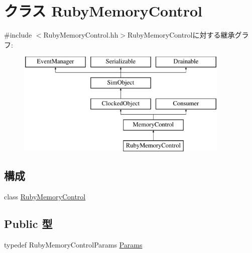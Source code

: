 \hypertarget{classRubyMemoryControl}{
\section{クラス RubyMemoryControl}
\label{classRubyMemoryControl}
}


{\ttfamily \#include $<$RubyMemoryControl.hh$>$}RubyMemoryControlに対する継承グラフ:\begin{figure}[H]
\begin{center}
\leavevmode
\includegraphics[height=5cm]{classRubyMemoryControl}
\end{center}
\end{figure}
\subsection*{構成}
\begin{DoxyCompactItemize}
\item 
class \hyperlink{classRubyMemoryControl_1_1RubyMemoryControl}{RubyMemoryControl}
\end{DoxyCompactItemize}
\subsection*{Public 型}
\begin{DoxyCompactItemize}
\item 
typedef RubyMemoryControlParams \hyperlink{classRubyMemoryControl_af43d4e91847a2856227bcb75a70a9a86}{Params}
\end{DoxyCompactItemize}
